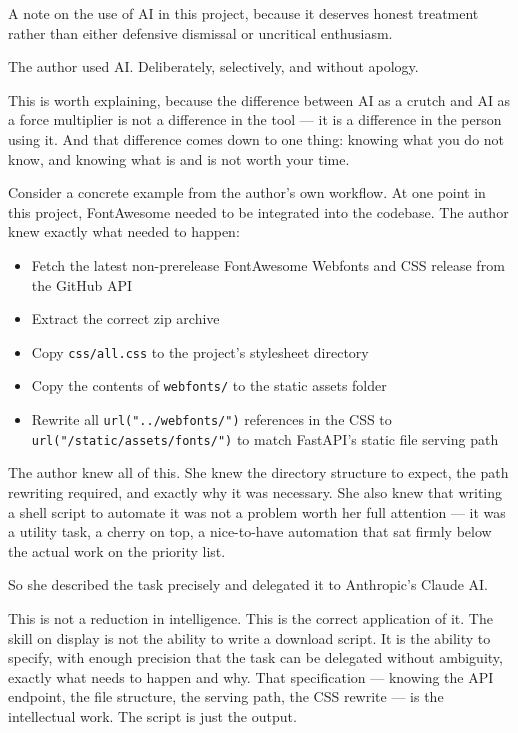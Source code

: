 \documentclass[11pt,a4paper]{book}
\begin{document}
A note on the use of AI in this project, because it deserves honest treatment rather than either defensive dismissal or uncritical enthusiasm.

The author used AI. Deliberately, selectively, and without apology.

This is worth explaining, because the difference between AI as a crutch and AI as a force multiplier is not a difference in the tool --- it is a difference in the person using it. And that difference comes down to one thing: knowing what you do not know, and knowing what is and is not worth your time.

Consider a concrete example from the author's own workflow. At one point in this project, FontAwesome needed to be integrated into the codebase. The author knew exactly what needed to happen:

\begin{itemize}
  \item Fetch the latest non-prerelease FontAwesome Webfonts and CSS release from the GitHub API
  \item Extract the correct zip archive
  \item Copy \texttt{css/all.css} to the project's stylesheet directory
  \item Copy the contents of \texttt{webfonts/} to the static assets folder
  \item Rewrite all \texttt{url("../webfonts/")} references in the CSS to \texttt{url("/static/assets/fonts/")} to match FastAPI's static file serving path
\end{itemize}

The author knew all of this. She knew the directory structure to expect, the path rewriting required, and exactly why it was necessary. She also knew that writing a shell script to automate it was not a problem worth her full attention --- it was a utility task, a cherry on top, a nice-to-have automation that sat firmly below the actual work on the priority list.

So she described the task precisely and delegated it to Anthropic's Claude AI.

This is not a reduction in intelligence. This is the correct application of it. The skill on display is not the ability to write a download script. It is the ability to specify, with enough precision that the task can be delegated without ambiguity, exactly what needs to happen and why. That specification --- knowing the API endpoint, the file structure, the serving path, the CSS rewrite --- is the intellectual work. The script is just the output.
\end{document}

